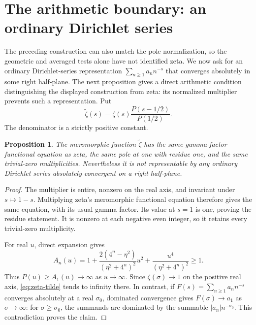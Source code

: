 \documentclass[11pt,a4paper]{article}
\newtheorem{proposition}[theorem]{Proposition}
\theoremstyle{definition}
\theoremstyle{remark}
\begin{document}
\section{The arithmetic boundary: an ordinary Dirichlet series}\label{sec:arithmetic}

The preceding construction can also match the pole normalization, so the
geometric and averaged tests alone have not identified zeta. We now ask for
an ordinary Dirichlet-series representation $\sum_{n\ge1}a_n n^{-s}$
that converges absolutely in some right half-plane. The next proposition gives a direct
arithmetic condition distinguishing the displayed construction from zeta:
its normalized multiplier prevents such a representation. Put
\begin{equation}\label{eq:zeta-tilde}
 \widetilde\zeta(s)=\zeta(s)\frac{P(s-1/2)}{P(1/2)}.
\end{equation}
The denominator is a strictly positive constant.

\begin{proposition}\label{prop:dirichlet}
The meromorphic function $\widetilde\zeta$ has the same gamma-factor
functional equation as zeta, the same pole at one with residue one, and
the same trivial-zero multiplicities. Nevertheless it is not representable
by any ordinary Dirichlet series absolutely convergent on a right half-plane.
\end{proposition}
\begin{proof}
The multiplier is entire, nonzero on the real axis, and invariant under
$s\mapsto1-s$. Multiplying zeta's meromorphic functional equation therefore
gives the same equation, with its usual gamma factor. Its value at $s=1$
is one, proving the residue statement. It is nonzero at each negative even
integer, so it retains every trivial-zero multiplicity.

For real $u$, direct expansion gives
\[
 A_n(u)=1+
 \frac{2(4^n-\eta^2)}{(\eta^2+4^n)^2}u^2+
 \frac{u^4}{(\eta^2+4^n)^2}\ge1.
\]
Thus $P(u)\ge A_1(u)\to\infty$ as $u\to\infty$. Since
$\zeta(\sigma)\to1$ on the positive real axis, \eqref{eq:zeta-tilde}
tends to infinity there. In contrast, if
$F(s)=\sum_{n\ge1}a_n n^{-s}$ converges absolutely at a real $\sigma_0$,
dominated convergence gives $F(\sigma)\to a_1$ as $\sigma\to\infty$:
for $\sigma\ge\sigma_0$, the summands are dominated by the summable
$|a_n|n^{-\sigma_0}$. This contradiction proves the claim.
\end{proof}
\end{document}
